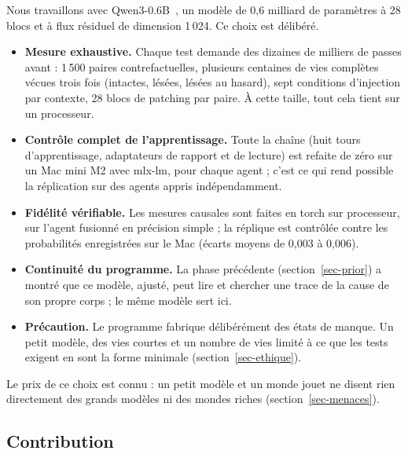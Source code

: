 \documentclass[11pt,a4paper]{article}
\begin{document}
Nous travaillons avec Qwen3-0.6B~\cite{qwen3}, un modèle de 0,6 milliard de
paramètres à 28 blocs et à flux résiduel de dimension 1\,024. Ce choix est
délibéré.
\begin{itemize}
\item \textbf{Mesure exhaustive.} Chaque test demande des dizaines de milliers de
passes avant : 1\,500 paires contrefactuelles, plusieurs centaines de vies
complètes vécues trois fois (intactes, lésées, lésées au hasard), sept
conditions d'injection par contexte, 28 blocs de patching par paire. À cette
taille, tout cela tient sur un processeur.
\item \textbf{Contrôle complet de l'apprentissage.} Toute la chaîne (huit tours
d'apprentissage, adaptateurs de rapport et de lecture) est refaite de zéro sur un
Mac mini M2 avec mlx-lm, pour chaque agent ; c'est ce qui rend possible la
réplication sur des agents appris indépendamment.
\item \textbf{Fidélité vérifiable.} Les mesures causales sont faites en torch sur
processeur, sur l'agent fusionné en précision simple ; la réplique est contrôlée
contre les probabilités enregistrées sur le Mac (écarts moyens de 0,003 à 0,006).
\item \textbf{Continuité du programme.} La phase précédente
(section~\ref{sec-prior}) a montré que ce modèle, ajusté, peut lire et chercher
une trace de la cause de son propre corps ; le même modèle sert ici.
\item \textbf{Précaution.} Le programme fabrique délibérément des états de manque.
Un petit modèle, des vies courtes et un nombre de vies limité à ce que les tests
exigent en sont la forme minimale (section~\ref{sec-ethique}).
\end{itemize}
Le prix de ce choix est connu : un petit modèle et un monde jouet ne disent rien
directement des grands modèles ni des mondes riches (section~\ref{sec-menaces}).

\subsection{Contribution}
\end{document}
